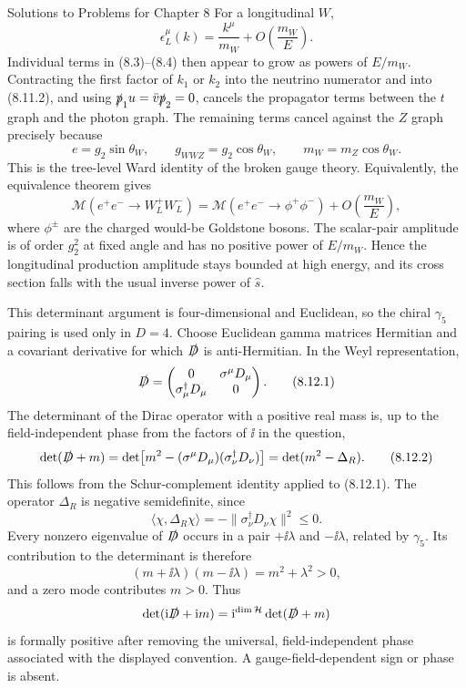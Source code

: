 \begin{bankssolutions}{Solutions to Problems for Chapter 8}
For a longitudinal $W$,
\[
  \epsilon_L^\mu(k)=\frac{k^\mu}{m_W}+O\!\left(\frac{m_W}{E}\right).
  \tag{8.11.8}
\]
Individual terms in (8.3)--(8.4) then appear to grow as powers of
$E/m_W$.  Contracting the first factor of $k_1$ or $k_2$ into the neutrino
numerator and into (8.11.2), and using
$\slashed p_1u=\bar v\slashed p_2=0$, cancels the propagator terms between the
$t$ graph and the photon graph.  The remaining terms cancel against the $Z$
graph precisely because
\[
  e=g_2\sin\theta_W,\qquad g_{WWZ}=g_2\cos\theta_W,\qquad
  m_W=m_Z\cos\theta_W .
  \tag{8.11.9}
\]
This is the tree-level Ward identity of the broken gauge theory.  Equivalently,
the equivalence theorem gives
\[
  \mathcal M(e^+e^-\to W_L^+W_L^-)
  =\mathcal M(e^+e^-\to\phi^+\phi^-)
  +O\!\left(\frac{m_W}{E}\right),
  \tag{8.11.10}
\]
where $\phi^\pm$ are the charged would-be Goldstone bosons.  The scalar-pair
amplitude is of order $g_2^2$ at fixed angle and has no positive power of
$E/m_W$.  Hence the longitudinal production amplitude stays bounded at high
energy, and its cross section falls with the usual inverse power of $\widehat s$.

This determinant argument is four-dimensional and Euclidean, so the chiral
$\gamma_5$ pairing is used only in $D=4$.
Choose Euclidean gamma matrices Hermitian and a covariant derivative for which
$\slashed D$ is anti-Hermitian.  In the Weyl representation,
\[
  \slashed D=
  \begin{pmatrix}
    0&\sigma^\mu D_\mu\\
    \sigma_\mu^\dagger D_\mu&0
  \end{pmatrix} .
  \tag{8.12.1}
\]
The determinant of the Dirac operator with a positive real mass is, up to the
field-independent phase from the factors of $\ii$ in the question,
\[
  \det(\slashed D+m)
  =\det\!\left[
    m^2-(\sigma^\mu D_\mu)(\sigma_\nu^\dagger D_\nu)
  \right]
  =\det(m^2-\Delta_R).
  \tag{8.12.2}
\]
This follows from the Schur-complement identity applied to (8.12.1).  The
operator $\Delta_R$ is negative semidefinite, since
\[
  \langle\chi,\Delta_R\chi\rangle
  =-\|\sigma_\nu^\dagger D_\nu\chi\|^2\leq0 .
  \tag{8.12.3}
\]
Every nonzero eigenvalue of $\slashed D$ occurs in a pair
$+\ii\lambda$ and $-\ii\lambda$, related by $\gamma_5$.  Its contribution to
the determinant is therefore
\[
  (m+\ii\lambda)(m-\ii\lambda)=m^2+\lambda^2>0,
  \tag{8.12.4}
\]
and a zero mode contributes $m>0$.  Thus
\[
  \det(\mathrm{i}\slashed D+\mathrm{i} m)
  =\mathrm{i}^{\dim\mathcal H}\det(\slashed D+m)
\]
is formally positive after removing the universal, field-independent phase
associated with the displayed convention.  A gauge-field-dependent sign or
phase is absent.


\end{bankssolutions}
